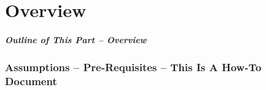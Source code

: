 \newpage
\part{Overview}

\begin{latexonly}
  \begin{presentationMode}

    \begin{frame}
      \partpage
    \end{frame}
    
\begin{frame}[fragile,plain,label=Part0]
\frametitle{Outline of This Part -- Overview}
\tableofcontents[sectionstyle=show,subsectionstyle=show]
\end{frame}
\end{presentationMode}
\end{latexonly}


\begin{comment}
*  [[elisp:(org-cycle)][| ]] [[elisp:(org-show-subtree)][|=]] [[elisp:(show-children 10)][|V]] [[elisp:(bx:orgm:indirectBufOther)][|>]] [[elisp:(bx:orgm:indirectBufMain)][|I]] [[elisp:(blee:ppmm:org-mode-toggle)][|N]] [[elisp:(org-top-overview)][|O]] [[elisp:(progn (org-shifttab) (org-content))][|C]] [[elisp:(delete-other-windows)][|1]]  /Section/   Assumptions -- Pre-Requisites -- This Is A How-To Document ::  [[elisp:(org-cycle)][| ]]
\end{comment}

\section{Assumptions -- Pre-Requisites -- This Is A How-To Document}

\begin{comment}
**  [[elisp:(org-cycle)][| ]] [[elisp:(org-show-subtree)][|=]] [[elisp:(show-children 10)][|V]] [[elisp:(bx:orgm:indirectBufOther)][|>]] [[elisp:(bx:orgm:indirectBufMain)][|I]] [[elisp:(blee:ppmm:org-mode-toggle)][|N]] [[elisp:(org-top-overview)][|O]] [[elisp:(progn (org-shifttab) (org-content))][|C]] [[elisp:(delete-other-windows)][|1]]  /Subsection/   Pre-Requisites And Related Topics ::  [[elisp:(org-cycle)][| ]]
\end{comment}

